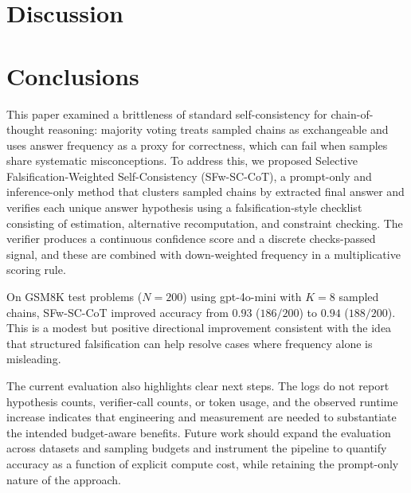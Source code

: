 \documentclass[journal,article,accept,pdftex,moreauthors]{Definitions/mdpi}
\begin{document}
\section{Discussion}



\section{Conclusions}

This paper examined a brittleness of standard self-consistency for chain-of-thought reasoning: majority voting treats sampled chains as exchangeable and uses answer frequency as a proxy for correctness, which can fail when samples share systematic misconceptions. To address this, we proposed Selective Falsification-Weighted Self-Consistency (SFw-SC-CoT), a prompt-only and inference-only method that clusters sampled chains by extracted final answer and verifies each unique answer hypothesis using a falsification-style checklist consisting of estimation, alternative recomputation, and constraint checking. The verifier produces a continuous confidence score and a discrete checks-passed signal, and these are combined with down-weighted frequency in a multiplicative scoring rule.

On GSM8K test problems ($N = 200$) using gpt-4o-mini with $K = 8$ sampled chains, SFw-SC-CoT improved accuracy from $0.93$ ($186/200$) to $0.94$ ($188/200$). This is a modest but positive directional improvement consistent with the idea that structured falsification can help resolve cases where frequency alone is misleading.

The current evaluation also highlights clear next steps. The logs do not report hypothesis counts, verifier-call counts, or token usage, and the observed runtime increase indicates that engineering and measurement are needed to substantiate the intended budget-aware benefits. Future work should expand the evaluation across datasets and sampling budgets and instrument the pipeline to quantify accuracy as a function of explicit compute cost, while retaining the prompt-only nature of the approach.

\vspace{6pt}

\end{document}
